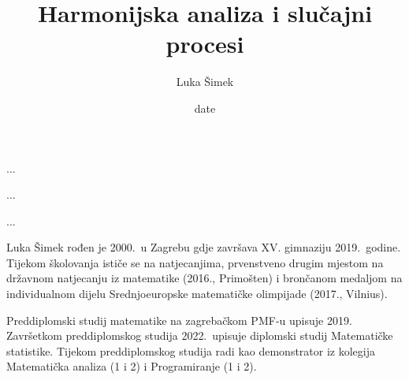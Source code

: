 \documentclass[a4paper,twoside,12pt]{memoir}
\title{Harmonijska analiza i slu\v{c}ajni procesi}
\author{Luka Šimek}
\date{date}
\numberwithin{teorem}{section}
\numberwithin{equation}{section}
\numberwithin{figure}{section}
\numberwithin{table}{section}
\begin{document}
\nocite{*}
\frontmatter

\begin{intro}
	...
\end{intro}



\printbibliography
\pagestyle{empty}

\begin{sazetak}
	...
\end{sazetak}

\begin{summary}
	...
\end{summary}

\begin{cv}
	Luka Šimek rođen je 2000.\ u Zagrebu gdje završava XV. gimnaziju 2019.\ godine. Tijekom školovanja ističe se na natjecanjima, prvenstveno drugim mjestom na državnom natjecanju iz matematike (2016., Primošten) i brončanom medaljom na individualnom dijelu Srednjoeuropske matematičke olimpijade (2017., Vilnius).

	Preddiplomski studij matematike na zagrebačkom PMF-u upisuje 2019. Završetkom preddiplomskog studija 2022.\ upisuje diplomski studij Matematičke statistike. Tijekom preddiplomskog studija radi kao demonstrator iz kolegija Matematička analiza (1 i 2) i Programiranje (1 i 2).
\end{cv}
\end{document}

